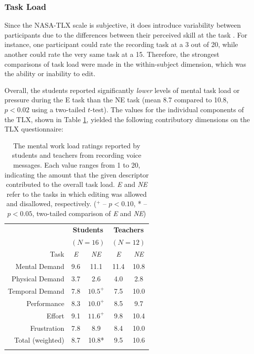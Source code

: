 \subsubsection{Task Load}
Since the NASA-TLX scale is subjective, it does introduce variability between participants due to the differences between their perceived skill at the task \cite{nasatlx}. 
For instance, one participant could rate the recording task at a 3 out of 20, while another could rate the very same task at a 15.
Therefore, the strongest comparisons of task load were made in the within-subject dimension, which was the ability or inability to edit.

Overall, the students reported significantly \emph{lower} levels of mental task load or pressure during the E task than the NE task (mean 8.7 compared to 10.8, $p<0.02$ using a two-tailed $t$-test). 
The values for the individual components of the TLX, shown in Table \ref{tab:table1}, yielded the following contributory dimensions on the TLX questionnaire:

\begin{table}
	\centering
	\begin{tabular}{r c c c c}
		& \multicolumn{2}{c}{\textbf{Students}} & \multicolumn{2}{c}{\textbf{Teachers}}\\
		& \multicolumn{2}{c}{$(N=16)$} & \multicolumn{2}{c}{$(N=12)$}\\
		\toprule
		Task			& \textit{E} & \textit{NE} & \textit{E} & \textit{NE}\\
		Mental Demand   & 9.6 & 11.1  & 11.4 & 10.8 \\
		Physical Demand & 3.7 & 2.6   & 4.0  & 2.8  \\
		Temporal Demand & 7.8 & $10.5^+$  & 7.5  & 10.0 \\
		Performance     & 8.3 & $10.0^+$  & 8.5  & 9.7  \\
		Effort          & 9.1 & $11.6^+$  & 9.8  & 10.4 \\
		Frustration     & 7.8 & 8.9   & 8.4  & 10.0 \\
		\midrule
		Total (weighted)& 8.7 & 10.8* & 9.5  & 10.6 \\
		\bottomrule \\
	\end{tabular}
	\caption{The mental work load ratings reported by students and teachers from recording voice messages. Each value ranges from 1 to 20, indicating the amount that the given descriptor contributed to the overall task load. \textit{E} and \textit{NE} refer to the tasks in which editing was allowed and disallowed, respectively. ($^+$ -- $p<0.10$, * -- $p<0.05$, two-tailed comparison of \textit{E} and \textit{NE})}~\label{tab:table1}
\end{table}

